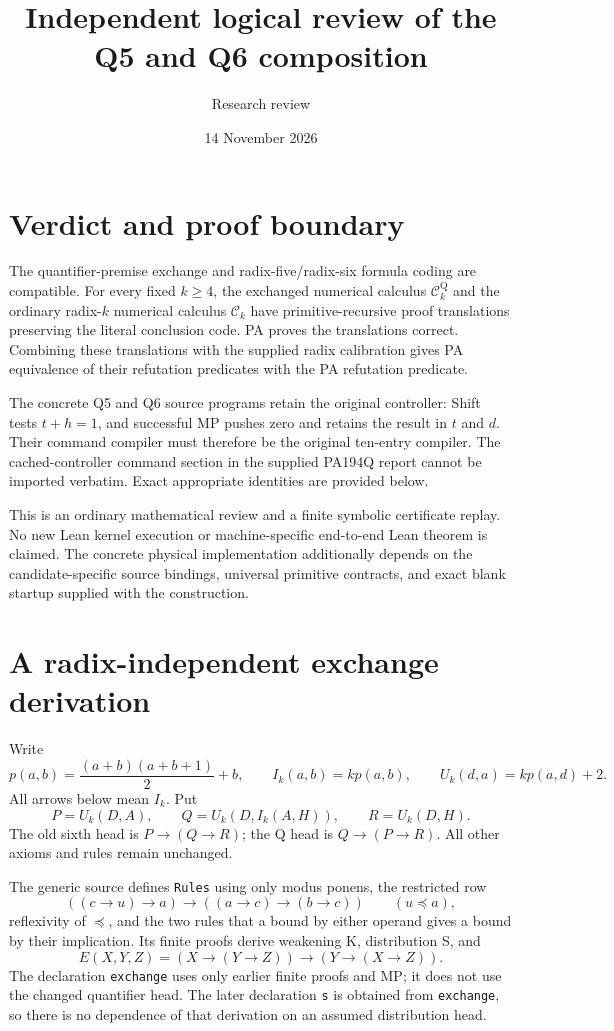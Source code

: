 \documentclass[11pt]{article}
\title{Independent logical review of the Q5 and Q6 composition}
\author{Research review}
\date{14 November 2026}
\newcommand{\C}{\mathcal C}
\begin{document}
\maketitle

\section{Verdict and proof boundary}
The quantifier-premise exchange and radix-five/radix-six formula coding
are compatible. For every fixed $k\ge4$, the exchanged numerical calculus
$\C_k^{\mathrm Q}$ and the ordinary radix-$k$ numerical calculus $\C_k$
have primitive-recursive proof translations preserving the literal
conclusion code. PA proves the translations correct. Combining these
translations with the supplied radix calibration gives PA equivalence of
their refutation predicates with the PA refutation predicate.

The concrete Q5 and Q6 source programs retain the original controller:
Shift tests $t+h=1$, and successful MP pushes zero and retains the result
in $t$ and $d$. Their command compiler must therefore be the original
ten-entry compiler. The cached-controller command section in the supplied
PA194Q report cannot be imported verbatim. Exact appropriate identities
are provided below.

This is an ordinary mathematical review and a finite symbolic certificate
replay. No new Lean kernel execution or machine-specific end-to-end
Lean theorem is claimed. The concrete physical implementation additionally
depends on the candidate-specific source bindings, universal primitive
contracts, and exact blank startup supplied with the construction.

\section{A radix-independent exchange derivation}
Write
\[
 p(a,b)=\frac{(a+b)(a+b+1)}2+b,\qquad
 I_k(a,b)=kp(a,b),\qquad U_k(d,a)=kp(a,d)+2.
\]
All arrows below mean $I_k$. Put
\[
 P=U_k(D,A),\qquad Q=U_k(D,I_k(A,H)),\qquad R=U_k(D,H).
\]
The old sixth head is $P\to(Q\to R)$; the Q head is
$Q\to(P\to R)$. All other axioms and rules remain unchanged.

The generic source  defines
\texttt{Rules} using only modus ponens, the restricted row
\[
 ((c\to u)\to a)\to((a\to c)\to(b\to c))\qquad(u\preceq a),
\]
reflexivity of $\preceq$, and the two rules that a bound by either
operand gives a bound by their implication. Its finite proofs derive
weakening K, distribution S, and
\[
 E(X,Y,Z)=(X\to(Y\to Z))\to(Y\to(X\to Z)).       \tag{1}
\]
The declaration \texttt{exchange} uses only earlier finite proofs and MP;
it does not use the changed quantifier head. The later declaration
\texttt{s} is obtained from \texttt{exchange}, so there is no dependence
of that derivation on an assumed distribution head.
\end{document}
